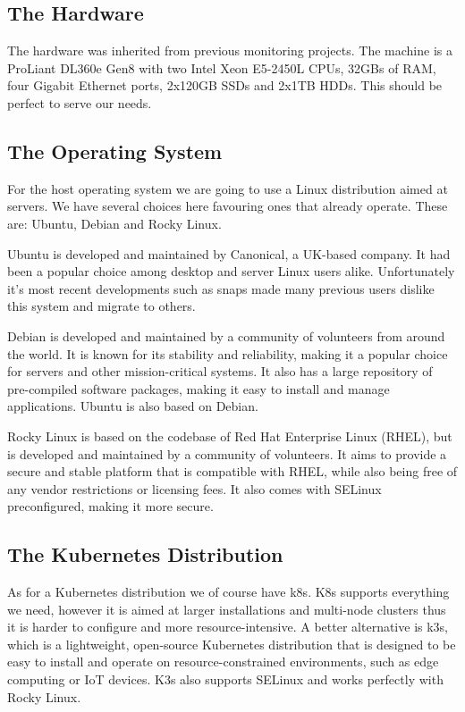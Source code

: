 \subsection{The Hardware}

The hardware was inherited from previous monitoring projects. The machine is a
ProLiant DL360e Gen8 with two Intel Xeon E5-2450L CPUs, 32GBs of RAM, four
Gigabit Ethernet ports, 2x120GB SSDs and 2x1TB HDDs. This should be perfect to
serve our needs.

\subsection{The Operating System}

For the host operating system we are going to use a Linux distribution aimed at
servers. We have several choices here favouring ones that \kszk already
operate. These are: Ubuntu, Debian and Rocky Linux.

Ubuntu is developed and maintained by Canonical, a UK-based company. It had
been a popular choice among desktop and server Linux users alike. Unfortunately
it's most recent developments such as snaps made many previous users dislike
this system and migrate to others.

Debian is developed and maintained by a community of volunteers from around the
world. It is known for its stability and reliability, making it a popular
choice for servers and other mission-critical systems. It also has a large
repository of pre-compiled software packages, making it easy to install and
manage applications. Ubuntu is also based on Debian.

Rocky Linux is based on the codebase of Red Hat Enterprise Linux (RHEL), but is
developed and maintained by a community of volunteers. It aims to provide a
secure and stable platform that is compatible with RHEL, while also being free
of any vendor restrictions or licensing fees. It also comes with SELinux
preconfigured, making it more secure.

\subsection{The Kubernetes Distribution}

As for a Kubernetes distribution we of course have k8s. K8s supports everything
we need, however it is aimed at larger installations and multi-node clusters
thus it is harder to configure and more resource-intensive. A better
alternative is k3s, which is a lightweight, open-source Kubernetes distribution
that is designed to be easy to install and operate on resource-constrained
environments, such as edge computing or IoT devices. K3s also supports SELinux
and works perfectly with Rocky Linux.

